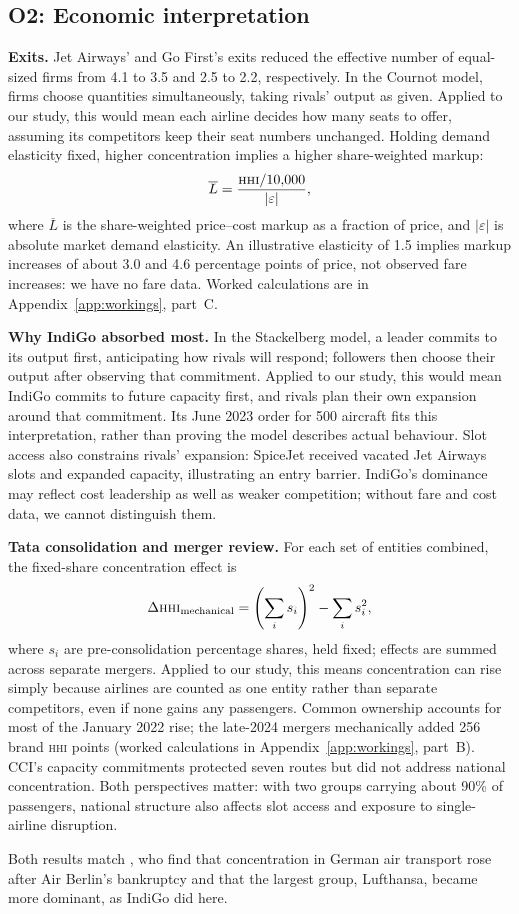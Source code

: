 \documentclass[12pt,a4paper]{article}
\newenvironment{authorcontribution}[1]{\par\begingroup\colorlet{currentAuthor}{#1}\color{#1}\captionsetup{font+={color=#1}}}{\par\endgroup}
\newcommand{\HHI}{\textsc{hhi}}
\begin{document}
\begin{authorcontribution}{authorMeena}
\subsection{O2: Economic interpretation}
\textbf{Exits.} Jet Airways' and Go First's exits reduced the effective number of equal-sized firms from 4.1 to 3.5 and 2.5 to 2.2, respectively. In the Cournot model, firms choose quantities simultaneously, taking rivals' output as given. Applied to our study, this would mean each airline decides how many seats to offer, assuming its competitors keep their seat numbers unchanged. Holding demand elasticity fixed, higher concentration implies a higher share-weighted markup:
\[
\overline{L} = \frac{\HHI/10{,}000}{|\varepsilon|},
\]
where $\overline{L}$ is the share-weighted price--cost markup as a fraction of price, and $|\varepsilon|$ is absolute market demand elasticity. An illustrative elasticity of 1.5 implies markup increases of about 3.0 and 4.6 percentage points of price, not observed fare increases: we have no fare data. Worked calculations are in Appendix~\ref{app:workings}, part~C.

\textbf{Why IndiGo absorbed most.} In the Stackelberg model, a leader commits to its output first, anticipating how rivals will respond; followers then choose their output after observing that commitment. Applied to our study, this would mean IndiGo commits to future capacity first, and rivals plan their own expansion around that commitment. Its June 2023 order for 500 aircraft fits this interpretation, rather than proving the model describes actual behaviour. Slot access also constrains rivals' expansion: SpiceJet received vacated Jet Airways slots and expanded capacity, illustrating an entry barrier. IndiGo's dominance may reflect cost leadership as well as weaker competition; without fare and cost data, we cannot distinguish them.

\textbf{Tata consolidation and merger review.} For each set of entities combined, the fixed-share concentration effect is
\[
\Delta\HHI_{\text{mechanical}} = \left(\sum_i s_i\right)^2 - \sum_i s_i^2,
\]
where $s_i$ are pre-consolidation percentage shares, held fixed; effects are summed across separate mergers. Applied to our study, this means concentration can rise simply because airlines are counted as one entity rather than separate competitors, even if none gains any passengers. Common ownership accounts for most of the January 2022 rise; the late-2024 mergers mechanically added 256 brand \HHI{} points (worked calculations in Appendix~\ref{app:workings}, part~B). CCI's capacity commitments protected seven routes but did not address national concentration. Both perspectives matter: with two groups carrying about 90\% of passengers, national structure also affects slot access and exposure to single-airline disruption.

Both results match \textcite{grosche2020concentration}, who find that concentration in German air transport rose after Air Berlin's bankruptcy and that the largest group, Lufthansa, became more dominant, as IndiGo did here.
\end{authorcontribution}
\end{document}
